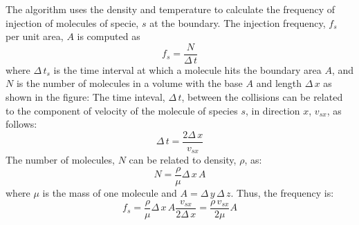 The algorithm uses the density and temperature to calculate the frequency of injection of molecules of specie, $s$ at the boundary. The injection frequency, $f_s$ per unit area, $A$ is computed as \[ f_s = \frac{N}{\Delta\,t} \] where $\Delta\,t_s$ is the time interval at which a molecule hits the boundary area $A$, and $N$ is the number of molecules in a volume with the base $A$ and length $\Delta\,x$ as shown in the figure:  The time inteval, $\Delta\,t$, between the collisions can be related to the component of velocity of the molecule of species $s$, in direction $x$, $v_{sx}$, as follows: \[ \Delta\,t = \frac{2\Delta\,x}{v_{sx}} \] The number of molecules, $N$ can be related to density, $\rho$, as: \[ N = \frac{\rho}{\mu}\Delta\,x\,A \] where $\mu$ is the mass of one molecule and $A = \Delta\,y\,\Delta\,z$. Thus, the frequency is: \[ f_s = \frac{\rho}{\mu}\Delta\,x\,A\frac{v_{sx}}{2\Delta\,x} = \frac{\rho\,v_{sx}}{2\mu}A \] 